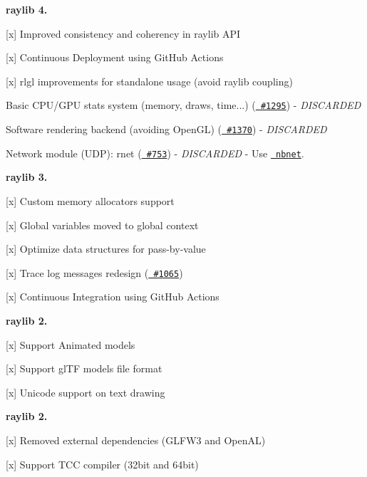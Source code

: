 {\bfseries{raylib 4.}}
\begin{DoxyItemize}
\item \mbox{[}x\mbox{]} Improved consistency and coherency in raylib API
\item \mbox{[}x\mbox{]} Continuous Deployment using Git\+Hub Actions
\item \mbox{[}x\mbox{]} rlgl improvements for standalone usage (avoid raylib coupling)
\item Basic CPU/\+GPU stats system (memory, draws, time...) (\href{https://github.com/raysan5/raylib/issues/1295}{\texttt{ \#1295}}) -\/ {\itshape DISCARDED}
\item Software rendering backend (avoiding Open\+GL) (\href{https://github.com/raysan5/raylib/issues/1370}{\texttt{ \#1370}}) -\/ {\itshape DISCARDED}
\item Network module (UDP)\+: {\ttfamily rnet} (\href{https://github.com/raysan5/raylib/issues/753}{\texttt{ \#753}}) -\/ {\itshape DISCARDED} -\/ Use \href{https://github.com/nathhB/nbnet}{\texttt{ nbnet}}.
\end{DoxyItemize}

{\bfseries{raylib 3.}}
\begin{DoxyItemize}
\item \mbox{[}x\mbox{]} Custom memory allocators support
\item \mbox{[}x\mbox{]} Global variables moved to global context
\item \mbox{[}x\mbox{]} Optimize data structures for pass-\/by-\/value
\item \mbox{[}x\mbox{]} Trace log messages redesign (\href{https://github.com/raysan5/raylib/issues/1065}{\texttt{ \#1065}})
\item \mbox{[}x\mbox{]} Continuous Integration using Git\+Hub Actions
\end{DoxyItemize}

{\bfseries{raylib 2.}}
\begin{DoxyItemize}
\item \mbox{[}x\mbox{]} Support Animated models
\item \mbox{[}x\mbox{]} Support gl\+TF models file format
\item \mbox{[}x\mbox{]} Unicode support on text drawing
\end{DoxyItemize}

{\bfseries{raylib 2.}}
\begin{DoxyItemize}
\item \mbox{[}x\mbox{]} Removed external dependencies (GLFW3 and Open\+AL)
\item \mbox{[}x\mbox{]} Support TCC compiler (32bit and 64bit)
\end{DoxyItemize}

